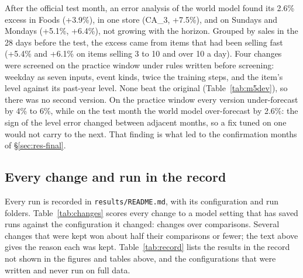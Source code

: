 After the official test month, an error analysis of the world model found its
2.6\% excess in Foods (+3.9\%), in one store (CA\_3, +7.5\%), and on Sundays and
Mondays (+5.1\%, +6.4\%), not growing with the horizon. Grouped by sales in the
28 days before the test, the excess came from items that had been selling fast
(+5.4\% and +6.1\% on items selling 3 to 10 and over 10 a day). Four changes
were screened on the practice window under rules written before screening:
weekday as seven inputs, event kinds, twice the training steps, and the item's
level against its past-year level. None beat the original
(Table~\ref{tab:m5dev}), so there was no second version. On the practice window
every version under-forecast by 4\% to 6\%, while on the test month the world
model over-forecast by 2.6\%: the sign of the level error changed between
adjacent months, so a fix tuned on one would not carry to the next. That
finding is what led to the confirmation months of \S\ref{sec:res-final}.

\subsection{Every change and run in the record}
\label{sec:dev-record}

Every run is recorded in \texttt{results/README.md}, with its configuration and
run folders. Table~\ref{tab:changes} scores every change to a model setting
that has saved runs against the configuration it changed: 
changes over  comparisons. Several changes that were kept
won about half their comparisons or fewer; the text above gives the reason each
was kept. Table~\ref{tab:record} lists the results in the record not shown in
the figures and tables above, and the configurations that were written and
never run on full data.



